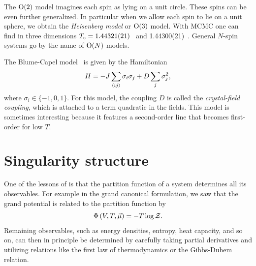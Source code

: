 The $\operatorname{\text{O}}(2)$ model imagines each spin as lying on a unit circle. These spins can be
even further generalized. In particular when we allow each spin to lie on a unit
sphere, we obtain the {\it Heisenberg model}
or $\operatorname{\text{O}}(3)$ model. With MCMC one can find in three dimensions
$T_{\rm c}=1.44321(21)$~\cite{peczak_high-accuracy_1991}
and 1.44300(21)~\cite{holm_critical_1993}.
General $N$-spin systems go by the name of $\operatorname{\text{O}}(N)$ models.

The Blume-Capel 
model~\cite{blume_theory_1966,capel_possibility_1966} is given
by the Hamiltonian
\begin{equation}\label{eq:blume-capel}
H=-J\sum_{\ev{i j}} \sigma_i \sigma_j+D \sum_j\sigma_j^2,
\end{equation}
where $\sigma_i\in\{-1,0,1\}$. For this model, the coupling $D$ is called
the {\it crystal-field coupling}, which is attached to a term quadratic in the
fields. This model is sometimes interesting because it features a second-order
line that becomes first-order for low $T$.

\section{Singularity structure}\label{sec:leeyang}

One of the lessons of  is that the partition function of a
system determines all its observables. For example in the grand canonical
formulation, we saw that the grand potential is related to the partition
function by
\begin{equation}\label{eq:grandPotZ}
  \Phi\left(V,T,\vec{\mu}\right)=-T\log\mathcal{Z}.
\end{equation}
Remaining observables, such as energy densities, entropy, heat capacity, and so
on, can then in principle be determined by carefully taking partial derivatives
and utilizing relations like the first law of thermodynamics or the Gibbs-Duhem
relation.


